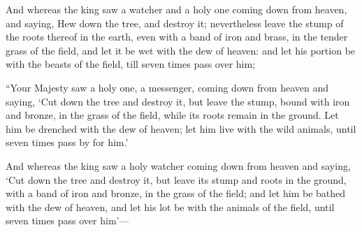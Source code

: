 			\begin{versebox}
					\item[BHS] 
					\item[LXX] 
					\item[ASV] And whereas the king saw a watcher and a holy one coming down from heaven, and saying, Hew down the tree, and destroy it; nevertheless leave the stump of the roots thereof in the earth, even with a band of iron and brass, in the tender grass of the field, and let it be wet with the dew of heaven: and let his portion be with the beasts of the field, till seven times pass over him;
					\item[NIV] “Your Majesty saw a holy one, a messenger, coming down from heaven and saying, ‘Cut down the tree and destroy it, but leave the stump, bound with iron and bronze, in the grass of the field, while its roots remain in the ground. Let him be drenched with the dew of heaven; let him live with the wild animals, until seven times pass by for him.’
					\item[NRSV] And whereas the king saw a holy watcher coming down from heaven and saying, ‘Cut down the tree and destroy it, but leave its stump and roots in the ground, with a band of iron and bronze, in the grass of the field; and let him be bathed with the dew of heaven, and let his lot be with the animals of the field, until seven times pass over him’—
			\end{versebox}

